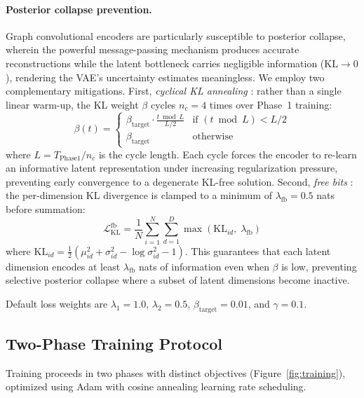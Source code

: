 \documentclass{article}
\begin{document}
\paragraph{Posterior collapse prevention.} Graph convolutional encoders are particularly susceptible to posterior collapse, wherein the powerful message-passing mechanism produces accurate reconstructions while the latent bottleneck carries negligible information ($\text{KL} \to 0$), rendering the VAE's uncertainty estimates meaningless. We employ two complementary mitigations. First, \textit{cyclical KL annealing} \citep{fu2019cyclical}: rather than a single linear warm-up, the KL weight $\beta$ cycles $n_c = 4$ times over Phase~1 training:
\begin{equation}
\beta(t) = \begin{cases}
\beta_{\text{target}} \cdot \frac{t \bmod L}{L/2} & \text{if } (t \bmod L) < L/2 \\
\beta_{\text{target}} & \text{otherwise}
\end{cases}
\end{equation}
where $L = T_{\text{Phase1}} / n_c$ is the cycle length. Each cycle forces the encoder to re-learn an informative latent representation under increasing regularization pressure, preventing early convergence to a degenerate KL-free solution. Second, \textit{free bits} \citep{kingma2016improved}: the per-dimension KL divergence is clamped to a minimum of $\lambda_{\text{fb}} = 0.5$ nats before summation:
\begin{equation}
\mathcal{L}_{\text{KL}}^{\text{fb}} = \frac{1}{N} \sum_{i=1}^N \sum_{d=1}^D \max\left(\text{KL}_{id},\; \lambda_{\text{fb}}\right)
\end{equation}
where $\text{KL}_{id} = \frac{1}{2}(\mu_{id}^2 + \sigma_{id}^2 - \log\sigma_{id}^2 - 1)$. This guarantees that each latent dimension encodes at least $\lambda_{\text{fb}}$ nats of information even when $\beta$ is low, preventing selective posterior collapse where a subset of latent dimensions become inactive.

Default loss weights are $\lambda_1 = 1.0$, $\lambda_2 = 0.5$, $\beta_{\text{target}} = 0.01$, and $\gamma = 0.1$.

\subsection{Two-Phase Training Protocol}

Training proceeds in two phases with distinct objectives (Figure~\ref{fig:training}), optimized using Adam \citep{kingma2014adam} with cosine annealing learning rate scheduling.
\end{document}
